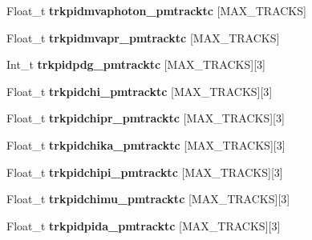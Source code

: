 \begin{DoxyCompactItemize}
\item 
\hypertarget{classanatree_a7852dd9ddd40910fcf22292953ab0a68}{Float\-\_\-t {\bfseries trkpidmvaphoton\-\_\-pmtracktc} \mbox{[}M\-A\-X\-\_\-\-T\-R\-A\-C\-K\-S\mbox{]}}\label{classanatree_a7852dd9ddd40910fcf22292953ab0a68}

\item 
\hypertarget{classanatree_a54cbe0b7be68c4480faa489b0ade1c8c}{Float\-\_\-t {\bfseries trkpidmvapr\-\_\-pmtracktc} \mbox{[}M\-A\-X\-\_\-\-T\-R\-A\-C\-K\-S\mbox{]}}\label{classanatree_a54cbe0b7be68c4480faa489b0ade1c8c}

\item 
\hypertarget{classanatree_a9e947d81c3dc2d0f00559e64032feddb}{Int\-\_\-t {\bfseries trkpidpdg\-\_\-pmtracktc} \mbox{[}M\-A\-X\-\_\-\-T\-R\-A\-C\-K\-S\mbox{]}\mbox{[}3\mbox{]}}\label{classanatree_a9e947d81c3dc2d0f00559e64032feddb}

\item 
\hypertarget{classanatree_af314016c994fe3c3adf9b0cbb6de114c}{Float\-\_\-t {\bfseries trkpidchi\-\_\-pmtracktc} \mbox{[}M\-A\-X\-\_\-\-T\-R\-A\-C\-K\-S\mbox{]}\mbox{[}3\mbox{]}}\label{classanatree_af314016c994fe3c3adf9b0cbb6de114c}

\item 
\hypertarget{classanatree_a035912a933489b468e7a28e1988a5835}{Float\-\_\-t {\bfseries trkpidchipr\-\_\-pmtracktc} \mbox{[}M\-A\-X\-\_\-\-T\-R\-A\-C\-K\-S\mbox{]}\mbox{[}3\mbox{]}}\label{classanatree_a035912a933489b468e7a28e1988a5835}

\item 
\hypertarget{classanatree_a6b8dbf4d77dd24e6b9788c0e77773fe7}{Float\-\_\-t {\bfseries trkpidchika\-\_\-pmtracktc} \mbox{[}M\-A\-X\-\_\-\-T\-R\-A\-C\-K\-S\mbox{]}\mbox{[}3\mbox{]}}\label{classanatree_a6b8dbf4d77dd24e6b9788c0e77773fe7}

\item 
\hypertarget{classanatree_a124a40e7067d538954f04454014137e2}{Float\-\_\-t {\bfseries trkpidchipi\-\_\-pmtracktc} \mbox{[}M\-A\-X\-\_\-\-T\-R\-A\-C\-K\-S\mbox{]}\mbox{[}3\mbox{]}}\label{classanatree_a124a40e7067d538954f04454014137e2}

\item 
\hypertarget{classanatree_aeca26db80918f6dd7103dd1889aa09e8}{Float\-\_\-t {\bfseries trkpidchimu\-\_\-pmtracktc} \mbox{[}M\-A\-X\-\_\-\-T\-R\-A\-C\-K\-S\mbox{]}\mbox{[}3\mbox{]}}\label{classanatree_aeca26db80918f6dd7103dd1889aa09e8}

\item 
\hypertarget{classanatree_a78722ecfd18c56bd7524a2ec60f6eb47}{Float\-\_\-t {\bfseries trkpidpida\-\_\-pmtracktc} \mbox{[}M\-A\-X\-\_\-\-T\-R\-A\-C\-K\-S\mbox{]}\mbox{[}3\mbox{]}}\label{classanatree_a78722ecfd18c56bd7524a2ec60f6eb47}


\end{DoxyCompactItemize}
